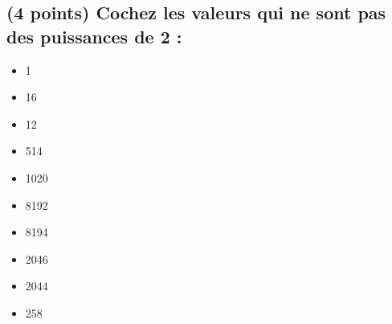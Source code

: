 \documentclass[11pt,a4paper]{article}
\begin{document}
\MakeExamTitle                   %




\renewcommand{\thesubsection}{\arabic{subsection}} %




\subsection{(4 points) Cochez les valeurs qui ne sont pas des puissances de 2 : }

\begin{table}[h!]
  \centering
  \begin{minipage}{0.45\textwidth}
\begin{itemize}
  \item[\CaseCoche] 1      \phantom{(} \\
  \item[\CaseCoche] 16     \phantom{(} \\
  \item[\checkmark] 12     \phantom{(} \\
  \item[\checkmark] 514    \phantom{(} \\
  \item[\checkmark] 1020   \phantom{(} \\
\end{itemize}
  \end{minipage}
  \hfillx
  \begin{minipage}{0.45\textwidth}
    \centering
\begin{itemize}
  \item[\CaseCoche] 8192   \phantom{(} \\
  \item[\checkmark] 8194   \phantom{(} \\
  \item[\checkmark] 2046   \phantom{(} \\
  \item[\checkmark] 2044   \phantom{(} \\
  \item[\checkmark] 258    \phantom{(} \\
\end{itemize}
  \end{minipage}
\end{table}
\end{document}
